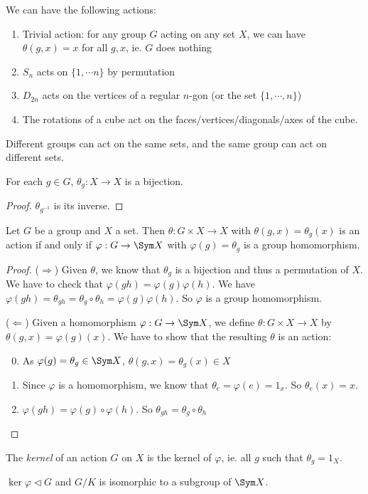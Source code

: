 \documentclass[a4paper]{article}
\begin{document}
  \begin{eg}
    We can have the following actions:
    \begin{enumerate}
      \item Trivial action: for any group $G$ acting on any set $X$, we can have $\theta(g, x) = x$ for all $g, x$, ie. $G$ does nothing
      \item $S_n$ acts on $\{1, \cdots n\}$ by permutation
      \item $D_{2n}$ acts on the vertices of a regular $n$-gon (or the set $\{1, \cdots, n\}$)
      \item The rotations of a cube act on the faces/vertices/diagonals/axes of the cube.
    \end{enumerate}
  \end{eg}
  \note Different groups can act on the same sets, and the same group can act on different sets.

  \begin{lemma}
    For each $g\in G$, $\theta_g: X\to X$ is a bijection.
  \end{lemma}

  \begin{proof}
    $\theta_{g^{-1}}$ is its inverse.
  \end{proof}

  \begin{prop}
    Let $G$ be a group and $X$ a set. Then $\theta: G\times X\to X$ with $\theta(g, x) = \theta_g(x)$ is an action if and only if $\varphi: G\to \Sym X$ with $\varphi(g) = \theta_g$ is a group homomorphism.
  \end{prop}

  \begin{proof}
    ($\Rightarrow$) Given $\theta$, we know that $\theta_g$ is a bijection and thus a permutation of $X$. We have to check that $\varphi(gh) = \varphi(g)\varphi(h)$. We have $\varphi(gh) = \theta_{gh} = \theta_g\circ \theta_h = \varphi(g)\varphi(h)$. So $\varphi$ is a group homomorphism.

    ($\Leftarrow$) Given a homomorphism $\varphi: G\to \Sym X$, we define $\theta: G\times X\to X$ by $\theta(g, x) = \varphi(g)(x)$. We have to show that the resulting $\theta$ is an action:
    \begin{enumerate}[label=\arabic{*}.]
        \setcounter{enumi}{-1}
      \item As $\varphi(g) = \theta_g\in \Sym X$, $\theta(g, x) = \theta_g (x)\in X$
      \item Since $\varphi$ is a homomorphism, we know that $\theta_e  = \varphi(e) = 1_x$. So $\theta_e(x) = x$.
      \item $\varphi (gh) = \varphi(g)\circ \varphi(h)$. So $\theta_{gh} = \theta_g\circ \theta_h$
    \end{enumerate}
  \end{proof}
  \begin{defi}
    The \emph{kernel} of an action $G$ on $X$ is the kernel of $\varphi$, ie. all $g$ such that $\theta_g = 1_X$.
  \end{defi}
  \note $\ker \varphi\lhd G$ and $G/K$ is isomorphic to a subgroup of $\Sym X$.
\end{document}
